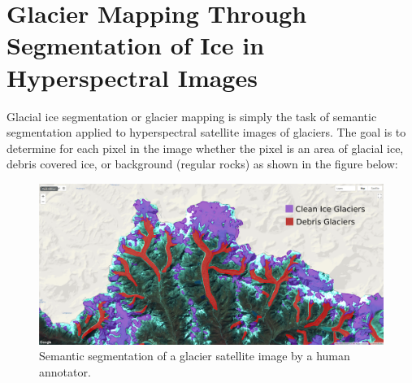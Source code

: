 \section{Glacier Mapping Through Segmentation of Ice in Hyperspectral Images}
Glacial ice segmentation or glacier mapping is simply the task of semantic segmentation applied to hyperspectral satellite images of glaciers. The goal is to determine for each pixel in the image whether the pixel is an area of glacial ice, debris covered ice, or background (regular rocks) as shown in the figure below:

\begin{figure}[H] \centering
    \includegraphics[width=\linewidth]{figures/glacier_mapping.png}
    \caption{Semantic segmentation of a glacier satellite image by a human annotator.}
\end{figure}


